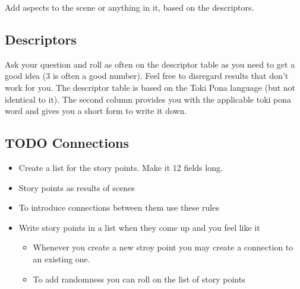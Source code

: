 \documentclass[11pt]{article}
\begin{document}
{Add aspects to the scene or anything in it, based on the descriptors.
\subsection{Descriptors}
\label{sec:org08a77a2}

Ask your question and roll as often on the descriptor table as you need to get a good idea (3 is often a good number). Feel free to disregard results that don't work for you.
The descriptor table is based on the Toki Pona language (but not identical to it). The second column provides you with the applicable toki pona word and gives you a short form to write it down. 
\subsection{{\bfseries\sffamily TODO} Connections}
\label{sec:orgc42748f}
\begin{itemize}
\item Create a list for the story points. Make it 12 fields long.
\item Story points as results of scenes
\item To introduce connections between them use these rules
\item Write story points in a list when they come up and you feel like it
\begin{itemize}
\item Whenever you create a new stroy point you may create a connection to an existing one.
\item To add randomness you can roll on the list of story points
\end{itemize}
\end{itemize}

\newpage
}
\end{document}
